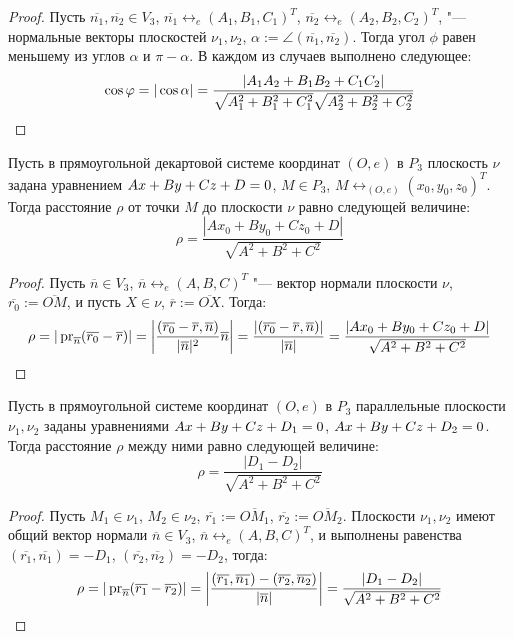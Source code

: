 \begin{proof}
	Пусть $\overline{n_1}, \overline{n_2} \in V_3$, $\overline{n_1} \leftrightarrow_{e} (A_1, B_1, C_1)^T$, $\overline{n_2} \leftrightarrow_{e} (A_2, B_2, C_2)^T$, "--- нормальные векторы плоскостей $\nu_1, \nu_2$, $\alpha := \angle(\overline{n_1}, \overline{n_2})$. Тогда угол $\phi$ равен меньшему из углов $\alpha$ и $\pi - \alpha$. В каждом из случаев выполнено следующее:
	\[\cos{\phi} = |\cos{\alpha}| = \frac{|A_1A_2+B_1B_2 + C_1C_2|}{\sqrt{A_1^2+B_1^2 + C_1^2}\sqrt{A_2^2+B_2^2 + C_2^2}}\qedhere\]
\end{proof}

\begin{proposition}
	Пусть в прямоугольной декартовой системе координат $(O, e)$ в $P_3$ плоскость $\nu$ задана уравнением $Ax\hm{+}By+Cz+D=0$, $M \in P_3$, $M \leftrightarrow_{(O, e)} (x_0, y_0, z_0)^T$. Тогда расстояние $\rho$ от точки $M$ до плоскости $\nu$ равно следующей величине:
	\[\rho = \frac{|Ax_0 + By_0 + Cz_0+D|}{\sqrt{A^2 + B^2 + C^2}}\]
\end{proposition}

\begin{proof}
	Пусть $\overline{n} \in V_3$, $\overline n \leftrightarrow_{e} (A, B, C)^T$ "--- вектор нормали плоскости $\nu$, $\overline{r_0} := \overline{OM}$, и пусть $X \in \nu$, $\overline{r} := \overline{OX}$. Тогда:
	\[\rho = |\pr_{\overline{n}}(\overline{r_0} - \overline{r})|
	=
	\left|\frac{(\overline{r_0} - \overline{r}, \overline{n})}{|\overline{n}|^2}\overline{n}\right|
	= 
	\frac{|(\overline{r_0} - \overline{r}, \overline{n})|}{|\overline{n}|}
	=
	\frac{|Ax_0 + By_0 + Cz_0+D|}{\sqrt{A^2 + B^2+C^2}}\qedhere\]
\end{proof}

\begin{proposition}
	Пусть в прямоугольной системе координат $(O, e)$ в $P_3$ параллельные плоскости $\nu_1, \nu_2$ заданы уравнениями $Ax+By+Cz\hm{+}D_1=0$, $Ax\hm{+}By\hm{+}Cz+D_2=0$. Тогда расстояние $\rho$ между ними равно следующей величине:
	\[\rho = \frac{|D_1 - D_2|}{\sqrt{A^2 + B^2 + C^2}}\]
\end{proposition}

\begin{proof}
	Пусть $M_1\in \nu_1$, $M_2 \in \nu_2$, $\overline{r_1} := \overline{OM_1}$, $\overline{r_2} := \overline{OM_2}$. Плоскости $\nu_1, \nu_2$ имеют общий вектор нормали $\overline{n} \in V_3$, $\overline{n} \leftrightarrow_{e} (A, B, C)^T$, и выполнены равенства $(\overline{r_1}, \overline{n_1}) = -D_1$, $(\overline{r_2}, \overline{n_2}) = -D_2$, тогда:
	\[\rho = |\pr_{\overline{n}}(\overline{r_1} - \overline{r_2})| = \left|\frac{(\overline{r_1}, \overline{n_1}) - (\overline{r_2}, \overline{n_2})}{|\overline{n}|}\right| = \frac{|D_1 - D_2|}{\sqrt{A^2 + B^2 + C^2}}\qedhere\]
\end{proof}

